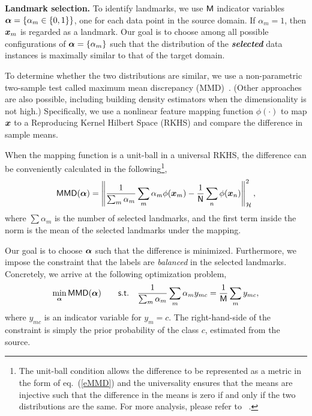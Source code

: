 {\bf Landmark selection.} To identify landmarks, we use  $\mathsf{M}$ indicator variables $\boldsymbol{\alpha}=\{\alpha_m \in \{0,1\}\}$, one for each data point in the source domain. If $\alpha_m = 1$, then $\boldsymbol{x}_m$ is regarded as a landmark. Our goal is to choose among all possible configurations of $\boldsymbol{\alpha}=\{\alpha_m\}$ such that the distribution of the \textbf{\emph{selected}} data instances is maximally similar to that of the target domain.

To determine whether the two distributions are similar, we use a non-parametric two-sample test called maximum mean discrepancy (MMD)~\cite{gretton2006kernel}. (Other approaches are also possible, including building density estimators when the dimensionality is not high.)  Specifically, we use a nonlinear feature mapping function $\phi(\cdot)$ to map $\boldsymbol{x}$ to a Reproducing Kernel Hilbert Space (RKHS) and compare the difference in sample means. {When the mapping function is a unit-ball in a universal RKHS, the difference can be conveniently calculated  in the following\footnote{The unit-ball condition allows the difference to be represented as a metric in the form of eq.~(\ref{eMMD}) and the universality ensures that the means are injective such that the difference in the means is zero if and only if the two distributions are the same. For more analysis, please refer to ~\cite{gretton2006kernel}.},
\begin{equation} \label{eMMD}
\mathsf{MMD}(\vct{\alpha}) = \left\| \frac{1}{\sum_m \alpha_m} \sum_m \alpha_m \phi (\vct{x}_m) - \frac{1}{\cst{N}} \sum_n \phi(\vct{x}_n)\right\|_{\mathcal{H}}^2,
\end{equation}
where $\sum \alpha_m$ is the number of selected landmarks, and the first term  inside the norm is the mean of the selected landmarks under the mapping.  

Our goal is to choose $\boldsymbol{\alpha}$ such that the difference is minimized. Furthermore, we impose the constraint that the labels are \emph{balanced} in the selected landmarks. Concretely, we arrive at the following optimization problem,
\begin{align} 
\min_{\vct{\alpha}}  \mathsf{MMD}(\vct{\alpha}) \qquad
\mathsf{s.t.} \quad \frac{1}{\sum_m \alpha_m} \sum_m \alpha_m y_{mc} = \frac{1}{{\cst{M}}}\sum_m y_{mc}, \label{eBalance}
\end{align}
where $y_{mc}$ is an indicator variable for $y_m = c$. The right-hand-side of the constraint is simply the prior probability of the class $c$, estimated from the source.}

